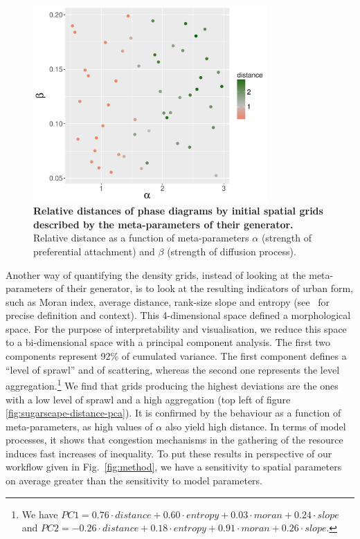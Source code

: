 \documentclass[3p,times,procedia]{elsarticle}
\begin{document}
\begin{figure}
\centering
\includegraphics[width=0.8\textwidth]{figures/relativedistance_metaparams}
\caption{\textbf{Relative distances of phase diagrams by initial spatial grids described by the meta-parameters of their generator.} Relative distance as a function of meta-parameters $\alpha$ (strength of preferential attachment) and $\beta$ (strength of diffusion process).}
\label{fig:sugarscape-distance-meta}
\end{figure}

Another way of quantifying the density grids, instead of looking at the meta-parameters of their generator, is to look at the resulting indicators of urban form, such as Moran index, average distance, rank-size slope and entropy (see~\cite{LeNechet2015} for precise definition and context). This 4-dimensional space defined a morphological space. For the purpose of interpretability and visualisation, we reduce this space to a bi-dimensional space with a principal component analysis. The first two components represent 92\% of cumulated variance. The first component defines a ``level of sprawl'' and of scattering, whereas the second one represents the level aggregation.\footnote{We have $PC1 = 0.76\cdot distance + 0.60\cdot entropy + 0.03\cdot moran + 0.24\cdot slope$ and $PC2 = -0.26\cdot distance + 0.18\cdot entropy + 0.91\cdot moran + 0.26\cdot slope$.} We find that grids producing the highest deviations are the ones with a low level of sprawl and a high aggregation (top left of figure \ref{fig:sugarscape-distance-pca}). It is confirmed by the behaviour as a function of meta-parameters, as high values of $\alpha$ also yield high distance. In terms of model processes, it shows that congestion mechanisms in the gathering of the resource induces fast increases of inequality. To put these results in perspective of our workflow given in Fig.~\ref{fig:method}, we have a sensitivity to spatial parameters on average greater than the sensitivity to model parameters.
\end{document}
